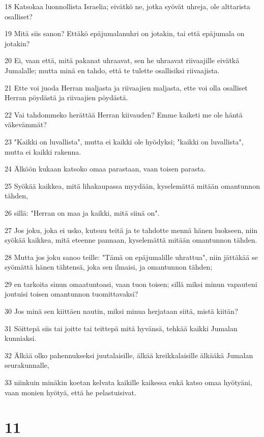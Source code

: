 \par 18 Katsokaa luonnollista Israelia; eivätkö ne, jotka syövät uhreja, ole alttarista osalliset?
\par 19 Mitä siis sanon? Ettäkö epäjumalanuhri on jotakin, tai että epäjumala on jotakin?
\par 20 Ei, vaan että, mitä pakanat uhraavat, sen he uhraavat riivaajille eivätkä Jumalalle; mutta minä en tahdo, että te tulette osallisiksi riivaajista.
\par 21 Ette voi juoda Herran maljasta ja riivaajien maljasta, ette voi olla osalliset Herran pöydästä ja riivaajien pöydästä.
\par 22 Vai tahdommeko herättää Herran kiivauden? Emme kaiketi me ole häntä väkevämmät?
\par 23 "Kaikki on luvallista", mutta ei kaikki ole hyödyksi; "kaikki on luvallista", mutta ei kaikki rakenna.
\par 24 Älköön kukaan katsoko omaa parastaan, vaan toisen parasta.
\par 25 Syökää kaikkea, mitä lihakaupassa myydään, kyselemättä mitään omantunnon tähden,
\par 26 sillä: "Herran on maa ja kaikki, mitä siinä on".
\par 27 Jos joku, joka ei usko, kutsuu teitä ja te tahdotte mennä hänen luokseen, niin syökää kaikkea, mitä eteenne pannaan, kyselemättä mitään omantunnon tähden.
\par 28 Mutta jos joku sanoo teille: "Tämä on epäjumalille uhrattua", niin jättäkää se syömättä hänen tähtensä, joka sen ilmaisi, ja omantunnon tähden;
\par 29 en tarkoita sinun omaatuntoasi, vaan tuon toisen; sillä miksi minun vapauteni joutuisi toisen omantunnon tuomittavaksi?
\par 30 Jos minä sen kiittäen nautin, miksi minua herjataan siitä, mistä kiitän?
\par 31 Söittepä siis tai joitte tai teittepä mitä hyvänsä, tehkää kaikki Jumalan kunniaksi.
\par 32 Älkää olko pahennukseksi juutalaisille, älkää kreikkalaisille älkääkä Jumalan seurakunnalle,
\par 33 niinkuin minäkin koetan kelvata kaikille kaikessa enkä katso omaa hyötyäni, vaan monien hyötyä, että he pelastuisivat.

\chapter{11}

